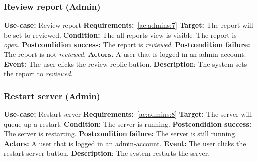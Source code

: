 \subsubsection{Review report (Admin)}\label{subsubsec:review-report}
\textbf{Use-case:} Review report \newline
\textbf{Requirements:}~\ref{ac:admins:7} \newline
\textbf{Target:} The report will be set to reviewed. \newline
\textbf{Condition:} The all-reports-view is visible.
The report is \textit{open}. \newline
\textbf{Postcondidion success:} The report is \textit{reviewed}. \newline
\textbf{Postcondition failure:} The report is not \textit{reviewed}. \newline
\textbf{Actors:} A user that is logged in an admin-account. \newline
\textbf{Event:} The user clicks the review-replic button. \newline
\textbf{Description}: The system sets the report to \textit{reviewed}.

\subsubsection{Restart server (Admin)}\label{subsubsec:restart-server}
\textbf{Use-case:} Restart server \newline
\textbf{Requirements:}~\ref{ac:admins:8} \newline
\textbf{Target:} The server will queue up a restart. \newline
\textbf{Condition:} The server is running. \newline
\textbf{Postcondidion success:} The server is restarting. \newline
\textbf{Postcondition failure:} The server is still running. \newline
\textbf{Actors:} A user that is logged in an admin-account. \newline
\textbf{Event:} The user clicks the restart-server button. \newline
\textbf{Description}: The system restarts the server.

